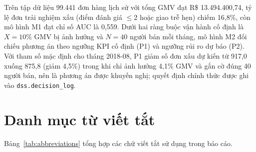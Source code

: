 \documentclass[a4paper]{article}
\begin{document}
Trên tập dữ liệu 99.441 đơn hàng lịch sử với tổng GMV đạt R\$ 13.494.400,74, tỷ lệ đơn trải nghiệm xấu (điểm đánh giá $\le 2$ hoặc giao trễ hẹn) chiếm 16,8\%, còn mô hình M1 đạt chỉ số AUC là 0,559. Dưới hai ràng buộc vận hành cố định là $X = 10\%$ GMV bị ảnh hưởng và $N = 40$ người bán mỗi tháng, mô hình M2 đối chiếu phương án theo ngưỡng KPI cố định (P1) và ngưỡng rủi ro dự báo (P2). Với tham số mặc định cho tháng 2018-08, P1 giảm số đơn xấu dự kiến từ 917,0 xuống 875,8 (giảm 4,5\%) trong khi chỉ ảnh hưởng 4,1\% GMV và gắn cờ đúng 40 người bán, nên là phương án được khuyến nghị; quyết định chính thức được ghi vào \texttt{dss.decision\_log}.

\newpage
{}
{}
\section*{Danh mục từ viết tắt}
\nopagebreak[4]
Bảng~\ref{tab:abbreviations} tổng hợp các chữ viết tắt sử dụng trong báo cáo.\par
\nopagebreak[4]
\end{document}
